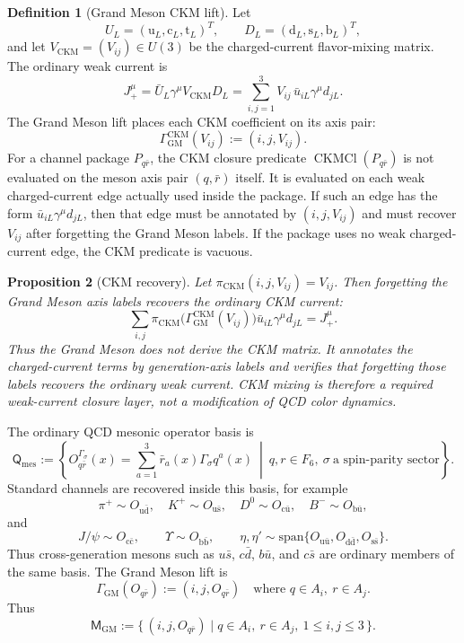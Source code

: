 \documentclass[11pt]{article}
\theoremstyle{definition}
\newtheorem{definition}{Definition}
\theoremstyle{plain}
\newtheorem{proposition}[definition]{Proposition}
\DeclareMathOperator{\CKMCl}{CKMCl}
\newcommand{\qu}{\mathrm u}
\newcommand{\qd}{\mathrm d}
\newcommand{\qc}{\mathrm c}
\newcommand{\qs}{\mathrm s}
\newcommand{\qt}{\mathrm t}
\newcommand{\qb}{\mathrm b}
\begin{document}
\begin{definition}[Grand Meson CKM lift]
Let
\[
  U_L=(\qu_L,\qc_L,\qt_L)^T,\qquad
  D_L=(\qd_L,\qs_L,\qb_L)^T,
\]
and let \(V_{\mathrm{CKM}}=(V_{ij})\in U(3)\) be the charged-current
flavor-mixing matrix.  The ordinary weak current is
\[
  J^\mu_+
  =
  \bar U_L\gamma^\mu V_{\mathrm{CKM}}D_L
  =
  \sum_{i,j=1}^{3}V_{ij}\,\bar u_{iL}\gamma^\mu d_{jL}.
\]
The Grand Meson lift places each CKM coefficient on its axis pair:
\[
  \Gamma_{\mathrm{GM}}^{\mathrm{CKM}}(V_{ij})
  :=
  (i,j,V_{ij}).
\]
For a channel package \(P_{q\bar r}\), the CKM closure predicate
\(\CKMCl(P_{q\bar r})\) is not evaluated on the meson axis pair
\((q,\bar r)\) itself.  It is evaluated on each weak charged-current edge
actually used inside the package.  If such an edge has the form
\(\bar u_{iL}\gamma^\mu d_{jL}\), then that edge must be annotated by
\((i,j,V_{ij})\) and must recover \(V_{ij}\) after forgetting the Grand
Meson labels.  If the package uses no weak charged-current edge, the CKM
predicate is vacuous.
\end{definition}

\begin{proposition}[CKM recovery]
Let \(\pi_{\mathrm{CKM}}(i,j,V_{ij})=V_{ij}\).  Then forgetting the Grand
Meson axis labels recovers the ordinary CKM current:
\[
  \sum_{i,j}\pi_{\mathrm{CKM}}
  \bigl(\Gamma_{\mathrm{GM}}^{\mathrm{CKM}}(V_{ij})\bigr)
  \bar u_{iL}\gamma^\mu d_{jL}
  =
  J^\mu_+ .
\]
Thus the Grand Meson does not derive the CKM matrix.  It annotates the
charged-current terms by generation-axis labels and verifies that forgetting
those labels recovers the ordinary weak current.  CKM mixing is therefore a
required weak-current closure layer, not a modification of QCD color
dynamics.
\end{proposition}

The ordinary QCD mesonic operator basis is
\[
  \mathsf Q_{\mathrm{mes}}
  :=
  \left\{
    O^{\Gamma_\sigma}_{q\bar r}(x)
    =
    \sum_{a=1}^{3}\bar r_a(x)\Gamma_\sigma q^a(x)
    \ \middle|\ q,r\in F_6,\ \sigma\ \text{a spin-parity sector}
  \right\}.
\]
Standard channels are recovered inside this basis, for example
\[
  \pi^+\sim O_{\qu\bar{\qd}},\quad
  K^+\sim O_{\qu\bar{\qs}},\quad
  D^0\sim O_{\qc\bar{\qu}},\quad
  B^-\sim O_{\qb\bar{\qu}},
\]
and
\[
  J/\psi\sim O_{\qc\bar{\qc}},
  \qquad
  \Upsilon\sim O_{\qb\bar{\qb}},
  \qquad
  \eta,\eta'\sim
  \mathrm{span}\{O_{\qu\bar{\qu}},O_{\qd\bar{\qd}},O_{\qs\bar{\qs}}\}.
\]
Thus cross-generation mesons such as \(u\bar s\), \(c\bar d\), \(b\bar u\),
and \(c\bar s\) are ordinary members of the same basis.
The Grand Meson lift is
\[
  \Gamma_{\mathrm{GM}}(O_{q\bar r})
  :=
  (i,j,O_{q\bar r})
  \quad
  \text{where }q\in A_i,\ r\in A_j.
\]
Thus
\[
  \mathsf M_{\mathrm{GM}}
  :=
  \{\,(i,j,O_{q\bar r})\mid q\in A_i,\ r\in A_j,\ 1\le i,j\le3\,\}.
\]
\end{document}
